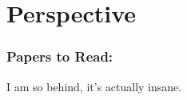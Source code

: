 \section{Perspective}



\subsubsection{Papers to Read:}

I am so behind, it's actually insane.\newline

